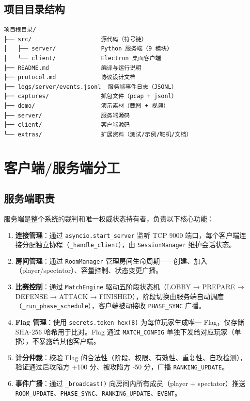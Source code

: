 \documentclass[12pt,a4paper]{ctexbook}
\begin{document}
\section{项目目录结构}

\begin{lstlisting}[language=bash]
项目根目录/
├── src/                    源代码（符号链）
│   ├── server/             Python 服务端（9 模块）
│   └── client/             Electron 桌面客户端
├── README.md               编译与运行说明
├── protocol.md             协议设计文档
├── logs/server/events.jsonl  服务端事件日志（JSONL）
├── captures/               抓包文件（pcap + jsonl）
├── demo/                   演示素材（截图 + 视频）
├── server/                 服务端源码
├── client/                 客户端源码
└── extras/                 扩展资料（测试/示例/靶机/文档）
\end{lstlisting}

\chapter{客户端/服务端分工}

\section{服务端职责}

服务端是整个系统的裁判和唯一权威状态持有者，负责以下核心功能：

\begin{enumerate}[label=\textbf{\arabic*.},itemsep=4pt]
  \item \textbf{连接管理}：通过 \texttt{asyncio.start\_server} 监听 TCP 9000 端口，每个客户端连接分配独立协程（\texttt{\_handle\_client}），由 \texttt{SessionManager} 维护会话状态。
  \item \textbf{房间管理}：通过 \texttt{RoomManager} 管理房间生命周期——创建、加入（player/spectator）、容量控制、状态变更广播。
  \item \textbf{比赛控制}：通过 \texttt{MatchEngine} 驱动五阶段状态机（LOBBY → PREPARE → DEFENSE → ATTACK → FINISHED），阶段切换由服务端自动调度（\texttt{\_run\_phase\_schedule}），客户端被动接收 \texttt{PHASE\_SYNC} 广播。
  \item \textbf{Flag 管理}：使用 \texttt{secrets.token\_hex(8)} 为每位玩家生成唯一 Flag，仅存储 SHA-256 哈希用于比对。Flag 通过 \texttt{MATCH\_CONFIG} 单独下发给对应玩家（单播），不暴露给其他客户端。
  \item \textbf{计分仲裁}：校验 Flag 的合法性（阶段、权限、有效性、重复性、自攻检测），验证通过后攻陷方 +100 分、被攻陷方 -50 分，广播 \texttt{RANKING\_UPDATE}。
  \item \textbf{事件广播}：通过 \texttt{\_broadcast()} 向房间内所有成员（player + spectator）推送 \texttt{ROOM\_UPDATE}、\texttt{PHASE\_SYNC}、\texttt{RANKING\_UPDATE}、\texttt{EVENT}。
\end{enumerate}
\end{document}
